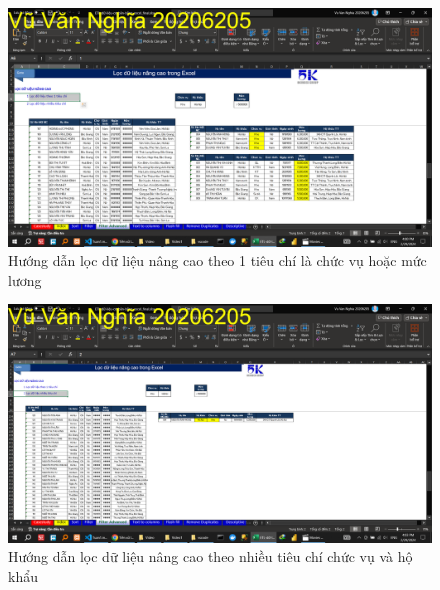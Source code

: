 \documentclass{article}
\begin{document}
\begin{figure}[h]
    \centering
    \includegraphics[scale = 0.15]{Video1/HuongDan/6.png}
    \caption{Hướng dẫn lọc dữ liệu nâng cao theo 1 tiêu chí là chức vụ hoặc mức lương}
\end{figure}
\begin{figure}[h]
    \centering
    \includegraphics[scale = 0.15]{Video1/HuongDan/7.png}
    \caption{Hướng dẫn lọc dữ liệu nâng cao theo nhiều tiêu chí chức vụ và hộ khẩu}
\end{figure}
\end{document}
